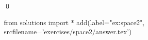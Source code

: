 
\begin{ex} 
  \label{ex:space2}
  
  \qed
\end{ex} 
\begin{python0}
from solutions import *
add(label="ex:space2",
    srcfilename='exercises/space2/answer.tex') 
\end{python0}
